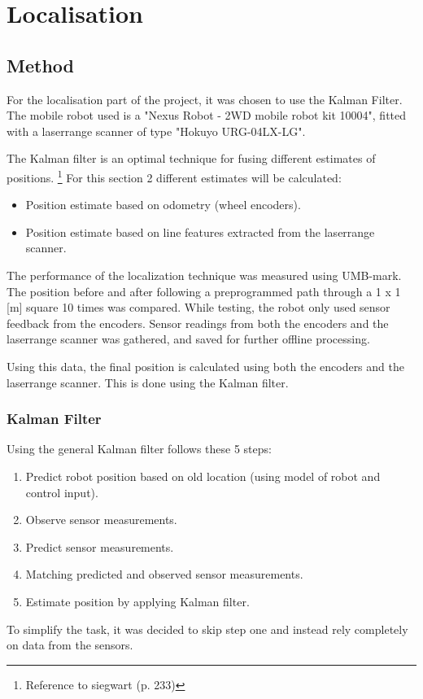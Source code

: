 \section{Localisation}
\subsection{Method}
For the localisation part of the project, it was chosen to use the Kalman Filter. The mobile robot used is a "Nexus Robot - 2WD mobile robot kit 10004", fitted with a laserrange scanner of type "Hokuyo URG-04LX-LG". 

The Kalman filter is an optimal technique for fusing different estimates of positions. \footnote{Reference to siegwart (p. 233)} 
For this section 2 different estimates will be calculated:

\begin{itemize}
	\item Position estimate based on odometry (wheel encoders).
	\item Position estimate based on line features extracted from the laserrange scanner. 
\end{itemize}


The performance of the localization technique was measured using UMB-mark. 
The position before and after following a preprogrammed path through a 1 x 1 [m] square 10 times was compared. 
While testing, the robot only used sensor feedback from the encoders. 
Sensor readings from both the encoders and the laserrange scanner was gathered, and saved for further offline processing. 

Using this data, the final position is calculated using both the encoders and the laserrange scanner. This is done using the Kalman filter. 

\subsubsection{Kalman Filter}
\label{sec:Kalman_filter}
Using the general Kalman filter follows these 5 steps: 
\begin{enumerate}
	\item Predict robot position based on old location (using model of robot and control input).
	\item Observe sensor measurements. 
	\item Predict sensor measurements. 
	\item Matching predicted and observed sensor measurements. 
	\item Estimate position by applying Kalman filter.
\end{enumerate}

To simplify the task, it was decided to skip step one and instead rely completely on data from the sensors. 

